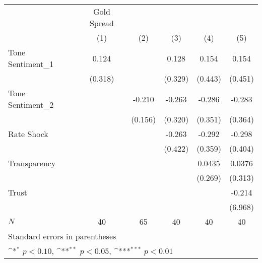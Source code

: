 {
\def\sym#1{\ifmmode^{#1}\else\(^{#1}\)\fi}
\begin{tabular}{l*{5}{c}}
\hline\hline
            & Gold Spread         &                     &                     &                     &                     \\
            &\multicolumn{1}{c}{(1)}         &\multicolumn{1}{c}{(2)}         &\multicolumn{1}{c}{(3)}         &\multicolumn{1}{c}{(4)}         &\multicolumn{1}{c}{(5)}         \\
\hline
Tone Sentiment\_{1}&       0.124         &                     &       0.128         &       0.154         &       0.154         \\
            &     (0.318)         &                     &     (0.329)         &     (0.443)         &     (0.451)         \\
[1em]
Tone Sentiment\_{2}&                     &      -0.210         &      -0.263         &      -0.286         &      -0.283         \\
            &                     &     (0.156)         &     (0.320)         &     (0.351)         &     (0.364)         \\
[1em]
Rate Shock  &                     &                     &      -0.263         &      -0.292         &      -0.298         \\
            &                     &                     &     (0.422)         &     (0.359)         &     (0.404)         \\
[1em]
Transparency&                     &                     &                     &      0.0435         &      0.0376         \\
            &                     &                     &                     &     (0.269)         &     (0.313)         \\
[1em]
Trust       &                     &                     &                     &                     &      -0.214         \\
            &                     &                     &                     &                     &     (6.968)         \\
\hline
\(N\)       &          40         &          65         &          40         &          40         &          40         \\
\hline\hline
\multicolumn{6}{l}{\footnotesize Standard errors in parentheses}\\
\multicolumn{6}{l}{\footnotesize \sym{*} \(p<0.10\), \sym{**} \(p<0.05\), \sym{***} \(p<0.01\)}\\
\end{tabular}
}
